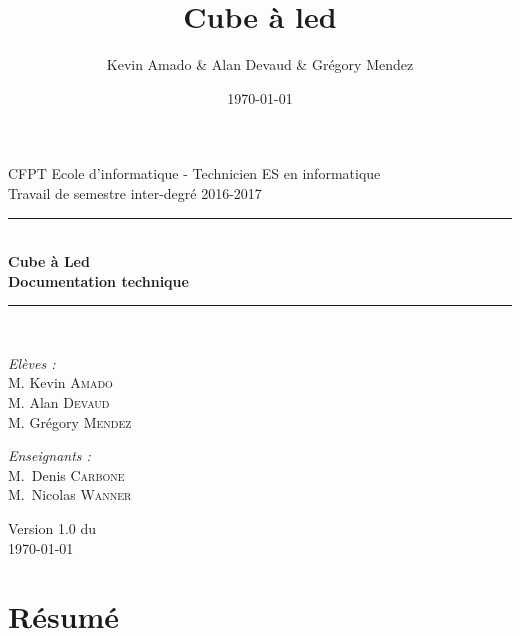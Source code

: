 \documentclass[a4paper,12pt]{article}
\title{Cube à led}
\author{Kevin Amado \& Alan Devaud \& Grégory Mendez}
\date{\today}
\begin{document}
	
\newcommand{\clcl}{\emph{CubeLedCommunicationLibrary} }
\newcommand{\addRef}[1]{Fig. \ref{#1} - page \pageref{#1}}

\begin{titlepage}
    \begin{center}
        {\large CFPT Ecole d'informatique - Technicien ES en informatique}\\[0.5cm]
        {\large Travail de semestre inter-degré 2016-2017}\\[0.5cm]
        
        \rule{\linewidth}{0.5mm} \\[0.4cm]
        { \huge \bfseries Cube à Led \\ Documentation technique\\[0.4cm] }
        \rule{\linewidth}{0.5mm} \\[1.5cm]
    
        \noindent
        \begin{minipage}{0.4\textwidth}
          \begin{flushleft} \large
            \emph{Elèves :}\\
            M. Kevin \textsc{Amado} \\
            M. Alan \textsc{Devaud}\\
            M. Grégory \textsc{Mendez}
          \end{flushleft}
        \end{minipage}%
        \begin{minipage}{0.4\textwidth}
          \begin{flushright} \large
            \emph{Enseignants :} \\
            M.~Denis \textsc{Carbone}\\
            M.~Nicolas \textsc{Wanner}
          \end{flushright}
        \end{minipage}
        
        \vfill

        {\large Version 1.0 du\\ \today}
    \end{center}
\end{titlepage}

\newpage

\section{Résumé}
\newpage
\end{document}
